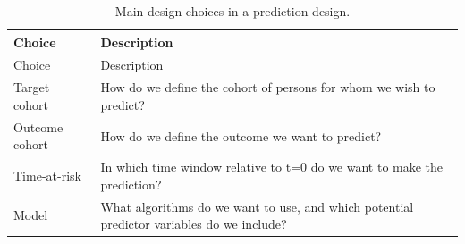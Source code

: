 \documentclass[11pt]{book}
\theoremstyle{definition}
\theoremstyle{definition}
\theoremstyle{definition}
\theoremstyle{remark}
\begin{document}
\begin{longtable}[]{@{}ll@{}}
\caption{\label{tab:plpDesign} Main design choices in a prediction
design.}\tabularnewline
\toprule
\begin{minipage}[b]{0.23\columnwidth}\raggedright\strut
Choice\strut
\end{minipage} & \begin{minipage}[b]{0.71\columnwidth}\raggedright\strut
Description\strut
\end{minipage}\tabularnewline
\midrule
\endfirsthead
\toprule
\begin{minipage}[b]{0.23\columnwidth}\raggedright\strut
Choice\strut
\end{minipage} & \begin{minipage}[b]{0.71\columnwidth}\raggedright\strut
Description\strut
\end{minipage}\tabularnewline
\midrule
\endhead
\begin{minipage}[t]{0.23\columnwidth}\raggedright\strut
Target cohort\strut
\end{minipage} & \begin{minipage}[t]{0.71\columnwidth}\raggedright\strut
How do we define the cohort of persons for whom we wish to
predict?\strut
\end{minipage}\tabularnewline
\begin{minipage}[t]{0.23\columnwidth}\raggedright\strut
Outcome cohort\strut
\end{minipage} & \begin{minipage}[t]{0.71\columnwidth}\raggedright\strut
How do we define the outcome we want to predict?\strut
\end{minipage}\tabularnewline
\begin{minipage}[t]{0.23\columnwidth}\raggedright\strut
Time-at-risk\strut
\end{minipage} & \begin{minipage}[t]{0.71\columnwidth}\raggedright\strut
In which time window relative to t=0 do we want to make the
prediction?\strut
\end{minipage}\tabularnewline
\begin{minipage}[t]{0.23\columnwidth}\raggedright\strut
Model\strut
\end{minipage} & \begin{minipage}[t]{0.71\columnwidth}\raggedright\strut
What algorithms do we want to use, and which potential predictor
variables do we include?\strut
\end{minipage}\tabularnewline
\bottomrule
\end{longtable}
\end{document}
